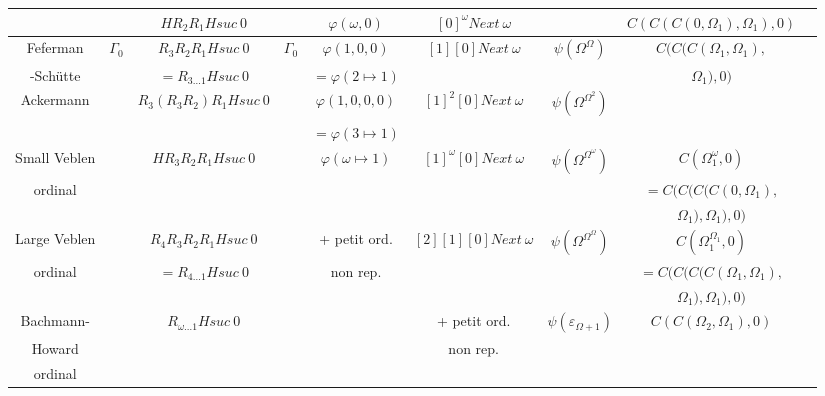 \documentclass[8pt]{article}
\begin{document}
\begin{tabular}{|c|c|c|c|c|c|c|c|c|}
		&			& \(H R_2 R_1 H suc\ 0\)&			& \(\varphi(\omega,0)\)		& \([0]^\omega Next\ \omega\) &					& \(C(C(C(0,\Omega_1),\Omega_1),0)\) \\ \hline
Feferman	& \(\Gamma_0\)		& \(R_3 R_2 R_1 H suc\ 0\)
								& \(\Gamma_0\)			& \(\varphi(1,0,0)\)		& \([1] [0] Next\ \omega\)	& \(\psi(\Omega^\Omega)\)		& \(C(C(C(\Omega_1,\Omega_1),\) \\ 
-Schütte	&			& \(= R_{3 \ldots 1} H suc\ 0\) &				& \(=\varphi(2 \mapsto 1)\)	&				& 					& \(\Omega_1),0)\)		\\ \hline
Ackermann	&			& \(R_3 (R_3 R_2) R_1 H suc\ 0\) &				& \(\varphi(1,0,0,0)\)		& \([1]^2 [0] Next\ \omega\) & \(\psi(\Omega^{\Omega^2})\)		&				\\ 
		&			&			&				& \(=\varphi(3 \mapsto 1)\)	&				&					&				\\ \hline
Small Veblen	&			& \(H R_3 R_2 R_1 H suc\ 0\) &				& \(\varphi(\omega \mapsto 1)\)	& \([1]^\omega [0] Next\ \omega\) & \(\psi(\Omega^{\Omega^\omega})\)	& \(C(\Omega_1^\omega,0)\)	\\
ordinal		&			&			&				&				&				&					& \(=C(C(C(C(0,\Omega_1), \)	\\ 
		&			&			&				&				&				&					& \(\Omega_1),\Omega_1),0)\)	\\ \hline
Large Veblen	&			& \(R_4 R_3 R_2 R_1 H suc\ 0\) &				& + petit ord.	 	 	& \([2] [1] [0] Next\ \omega\)	& \(\psi(\Omega^{\Omega^\Omega})\)	& \(C(\Omega_1^{\Omega_1},0)\)	\\
ordinal		&			& \(= R_{4 \ldots 1} H suc\ 0\) &				& non rep.			&				&					& \(=C(C(C(C(\Omega_1,\Omega_1),\) \\ 
		&			&			&				&				&				&					& \( \Omega_1),\Omega_1),0) \)	\\ \hline
Bachmann-	&			& \(R_{\omega \ldots 1} H suc\ 0\) &				&				& + petit ord.			& \(\psi(\varepsilon_{\Omega+1})\)	& \(C(C(\Omega_2,\Omega_1),0)\)	\\
Howard		&			&			&				&				& non rep.			&					&				\\ 
ordinal		&			&			&				&				&				&					&				\\ \hline
  
\end{tabular}
\end{document}
